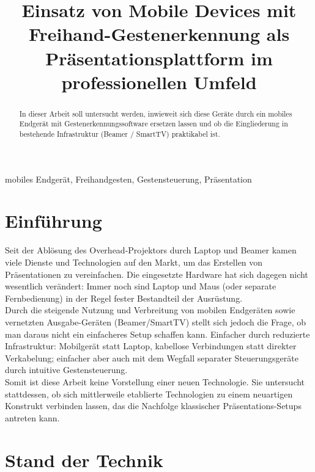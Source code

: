 \documentclass{article}
\title{Einsatz von Mobile Devices mit Freihand-Gestenerkennung als Präsentationsplattform im professionellen Umfeld}
\begin{document}
\maketitle

\begin{abstract}
In dieser Arbeit soll untersucht werden, inwieweit sich diese Geräte durch ein mobiles Endgerät mit Gestenerkennungssoftware ersetzen lassen und ob die Eingliederung in bestehende Infrastruktur (Beamer / SmartTV) praktikabel ist.
\end{abstract}

\begin{keywords}
mobiles Endgerät, Freihandgesten, Gestensteuerung, Präsentation
\end{keywords}

\section{Einführung}
Seit der Ablösung des Overhead-Projektors durch Laptop und Beamer kamen viele Dienste und Technologien auf den Markt, um das Erstellen von Präsentationen zu vereinfachen. 
Die eingesetzte Hardware hat sich dagegen nicht wesentlich verändert: Immer noch sind Laptop und Maus (oder separate Fernbedienung) in der Regel fester Bestandteil der Ausrüstung. \\
Durch die steigende Nutzung und Verbreitung von mobilen Endgeräten sowie vernetzten Ausgabe-Geräten (Beamer/SmartTV) stellt sich jedoch die Frage, ob man daraus nicht ein einfacheres Setup schaffen kann. Einfacher durch reduzierte Infrastruktur: Mobilgerät statt Laptop, kabellose Verbindungen statt direkter Verkabelung; einfacher aber auch mit dem Wegfall separater Steuerungsgeräte durch intuitive Gestensteuerung. \\
Somit ist diese Arbeit keine Vorstellung einer neuen Technologie. Sie untersucht stattdessen, ob sich mittlerweile etablierte Technologien zu einem neuartigen Konstrukt verbinden lassen, das die Nachfolge klassischer Präsentations-Setups antreten kann.

\section{Stand der Technik}
\end{document}
